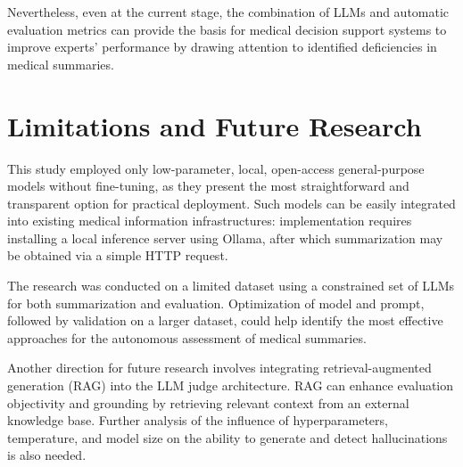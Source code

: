 \documentclass[runningheads]{llncs}
\begin{document}
Nevertheless, even at the current stage, the combination of LLMs and automatic evaluation metrics can provide the basis for medical decision support systems to improve experts' performance by drawing attention to identified deficiencies in medical summaries.

\section*{Limitations and Future Research}

This study employed only low-parameter, local, open-access general-purpose models without fine-tuning, as they present the most straightforward and transparent option for practical deployment. Such models can be easily integrated into existing medical information infrastructures: implementation requires installing a local inference server using Ollama, after which summarization may be obtained via a simple HTTP request.

The research was conducted on a limited dataset using a constrained set of LLMs for both summarization and evaluation. Optimization of model and prompt, followed by validation on a larger dataset, could help identify the most effective approaches for the autonomous assessment of medical summaries.

Another direction for future research involves integrating retrieval-augmented generation (RAG) into the LLM judge architecture. RAG can enhance evaluation objectivity and grounding by retrieving relevant context from an external knowledge base. Further analysis of the influence of hyperparameters, temperature, and model size on the ability to generate and detect hallucinations is also needed.
\end{document}
